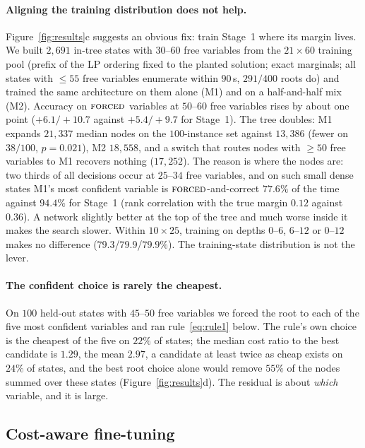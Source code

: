 \documentclass[final,5p,times,twocolumn]{elsarticle}
\newcommand{\FORCED}{\textsc{forced}}
\begin{document}
\paragraph{Aligning the training distribution does not help.} Figure~\ref{fig:results}c suggests an obvious fix: train Stage~1 where its margin lives. We built $2{,}691$ in-tree states with $30$--$60$ free variables from the $21\times60$ training pool (prefix of the LP ordering fixed to the planted solution; exact marginals; all states with $\le55$ free variables enumerate within $90$\,s, $291/400$ roots do) and trained the same architecture on them alone (\textsc{M1}) and on a half-and-half mix (\textsc{M2}). Accuracy on $\FORCED$ variables at $50$--$60$ free variables rises by about one point ($+6.1/+10.7$ against $+5.4/+9.7$ for Stage~1). The tree doubles: \textsc{M1} expands $21{,}337$ median nodes on the $100$-instance set against $13{,}386$ (fewer on $38/100$, $p=0.021$), \textsc{M2} $18{,}558$, and a switch that routes nodes with $\ge50$ free variables to \textsc{M1} recovers nothing ($17{,}252$). The reason is where the nodes are: two thirds of all decisions occur at $25$--$34$ free variables, and on such small dense states \textsc{M1}'s most confident variable is $\FORCED$-and-correct $77.6\%$ of the time against $94.4\%$ for Stage~1 (rank correlation with the true margin $0.12$ against $0.36$). A network slightly better at the top of the tree and much worse inside it makes the search slower. Within $10\times25$, training on depths $0$--$6$, $6$--$12$ or $0$--$12$ makes no difference ($79.3$/$79.9$/$79.9\%$). The training-state distribution is not the lever.

\paragraph{The confident choice is rarely the cheapest.} On $100$ held-out states with $45$--$50$ free variables we forced the root to each of the five most confident variables and ran rule~\eqref{eq:rule1} below. The rule's own choice is the cheapest of the five on $22\%$ of states; the median cost ratio to the best candidate is $1.29$, the mean $2.97$, a candidate at least twice as cheap exists on $24\%$ of states, and the best root choice alone would remove $55\%$ of the nodes summed over these states (Figure~\ref{fig:results}d). The residual is about \emph{which} variable, and it is large.

\subsection{Cost-aware fine-tuning}
\label{sec:exp-rl}
\end{document}
